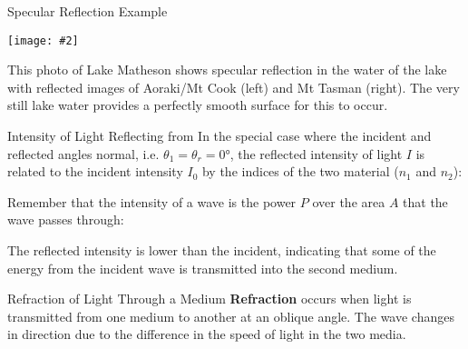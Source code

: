 \documentclass[compress,aspectratio=169]{beamer}
\newcommand{\pic}[2]{\texttt{[image: \#2]}}
\newcommand{\eq}[2]{\vspace{#1}{\LARGE\begin{displaymath}#2\end{displaymath}}}
\begin{document}
\begin{frame}{Specular Reflection Example}
  \begin{center}
    \pic{.55}{graphics/Lake-reflection.jpg}
  \end{center}
  This photo of Lake Matheson shows specular reflection in the water of the
  lake with reflected images of Aoraki/Mt Cook (left) and Mt Tasman (right).
  The very still lake water provides a perfectly smooth surface for this to
  occur.
\end{frame}


\begin{frame}{Intensity of Light Reflecting from}
  In the special case where the incident and reflected angles normal, i.e.
  $\theta_1=\theta_r=\ang{0}$, the reflected intensity of light $I$ is related
  to the incident intensity $I_0$ by the indices of the two material ($n_1$ and
  $n_2$):

  \eq{-.2in}{
    I=\left(\frac{n_1-n_2}{n_1+n_2}\right)^2 I_0
  }
  
  Remember that the intensity of a wave is the power $P$ over the area $A$ that
  the wave passes through:

  \eq{-.2in}{
    I=\frac{P}{A}
  }

  The reflected intensity is lower than the incident, indicating that some of
  the energy from the incident wave is transmitted into the second medium.
\end{frame}



\begin{frame}{Refraction of Light Through a Medium}
  \textbf{Refraction} occurs when light is transmitted from one medium to
  another at an oblique angle. The wave changes in direction due to the
  difference in the speed of light in the two media.
  \begin{center}
  \end{center}
\end{frame}
\end{document}
